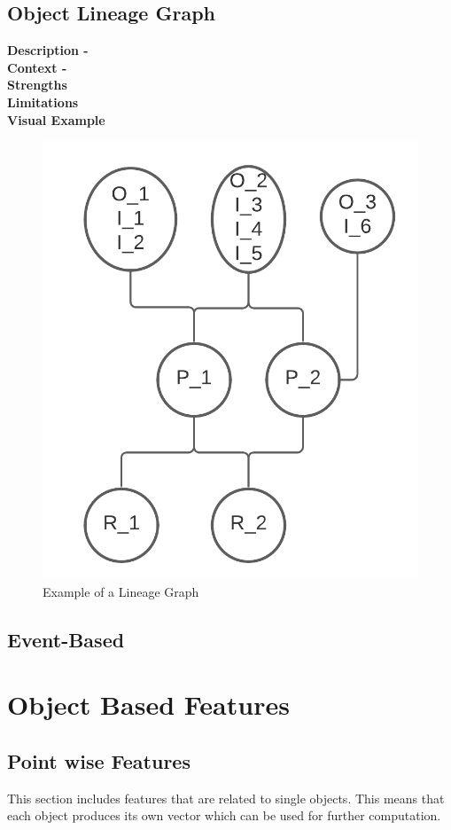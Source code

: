 \documentclass{article}
\begin{document}
\subsection{Object Lineage Graph}
\textbf{Description -}\\
\noindent\textbf{Context -}\\
\noindent\textbf{Strengths}\\
\noindent\textbf{Limitations}\\
\noindent\textbf{Visual Example}
\begin{figure}[h]
	\centering
	\includegraphics[scale=0.8]{images/lineage.png}
	\caption{Example of a Lineage Graph}
	\label{fig:lineage}
\end{figure}

\subsection{Event-Based}
\section{Object Based Features}
\subsection{Point wise Features}
This section includes features that are related to single objects. This means that each object produces its own vector which can be used for further computation.
\end{document}
